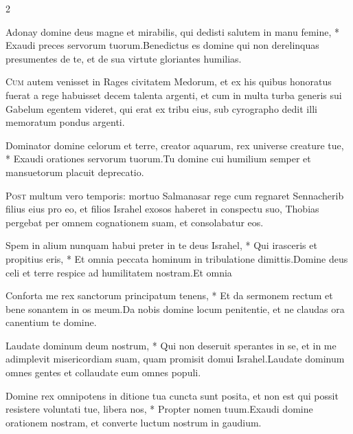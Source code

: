 \begin{multicols*}{2}
\begin{responsory}
{Adonay domine deus magne et mirabilis, qui dedisti salutem in manu femine, * Exaudi preces servorum tuorum.}{Benedictus es domine qui non derelinquas presumentes de te, et de sua virtute gloriantes humilias.}
\end{responsory}%
\lettrine[lines=2]{\zallmancaps \color{Blue} C}{um} autem venisset in Rages civitatem Medorum, et ex his quibus honoratus fuerat a rege habuisset decem talenta argenti, et cum in multa turba generis sui Gabelum egentem videret, qui erat ex tribu eius, sub cyrographo dedit illi memoratum pondus argenti.
\begin{responsory}
{Dominator domine celorum et terre, creator aquarum, rex universe creature tue, * Exaudi orationes servorum tuorum.}{Tu domine cui humilium semper et mansuetorum placuit deprecatio.}
\end{responsory}%
\lettrine[lines=2]{\zallmancaps \color{Red} P}{ost} multum vero temporis: mortuo Salmanasar rege cum regnaret Sennacherib filius eius pro eo, et filios Israhel exosos haberet in conspectu suo, Thobias pergebat per omnem cognationem suam, et consolabatur eos.
\begin{responsory-final}
{Spem in alium nunquam habui preter in te deus Israhel, * Qui irasceris et propitius eris, * Et omnia peccata hominum in tribulatione dimittis.}{Domine deus celi et terre respice ad humilitatem nostram.}{Et omnia}
\end{responsory-final}%
\begin{responsory}
{Conforta me rex sanctorum principatum tenens, * Et da sermonem rectum et bene sonantem in os meum.}{Da nobis domine locum penitentie, et ne claudas ora canentium te domine.}
\end{responsory}%
\begin{responsory}
{Laudate dominum deum nostrum, * Qui non deseruit sperantes in se, et in me adimplevit misericordiam suam, quam promisit domui Israhel.}{Laudate dominum omnes gentes et collaudate eum omnes populi.}
\end{responsory}%
\begin{responsory-doxology}
{Domine rex omnipotens in ditione tua cuncta sunt posita, et non est qui possit resistere voluntati tue, libera nos, * Propter nomen tuum.}{Exaudi domine orationem nostram, et converte luctum nostrum in gaudium.}

\end{responsory-doxology}
\end{multicols*}
